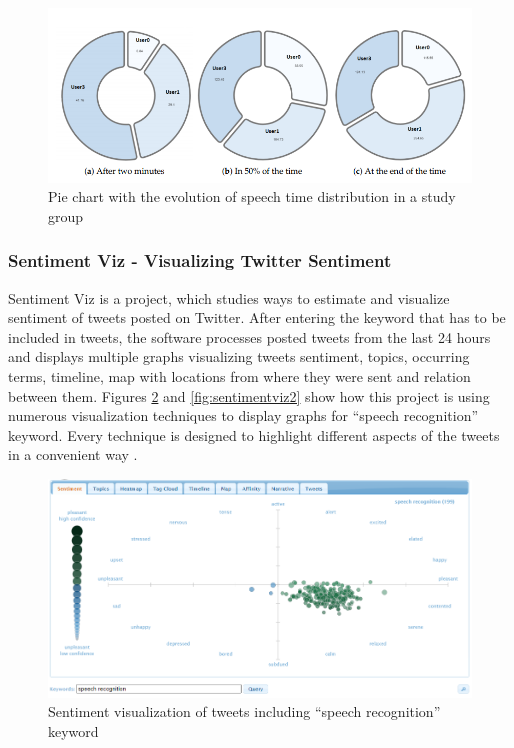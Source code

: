 \documentclass{article}
\begin{document}
\begin{figure}[H]
  \centering
  \includegraphics[scale=0.6]{img/naira2.png}
  \caption{Pie chart with the evolution of speech time distribution in a study group}
  \label{fig:naira2}
\end{figure}

\subsubsection{Sentiment Viz - Visualizing Twitter Sentiment}
{\large 
Sentiment Viz is a project, which studies ways to estimate and visualize sentiment of tweets posted on Twitter. After entering the keyword that has to be included in tweets, the software processes posted tweets from the last 24 hours and displays multiple graphs visualizing tweets sentiment, topics, occurring terms, timeline, map with locations from where they were sent and relation between them. Figures \ref{fig:sentimentviz} and \ref{fig:sentimentviz2} show how this project is using numerous visualization techniques to display graphs for ``speech recognition'' keyword. Every technique is designed to highlight different aspects of the tweets in a convenient way \parencite{twittersentiment}.\par
}

\begin{figure}[H]
  \centering
  \includegraphics[scale=0.5]{img/sentimentviz.png}
  \caption{Sentiment visualization of tweets including ``speech recognition'' keyword}
  \label{fig:sentimentviz}
\end{figure}
\end{document}
